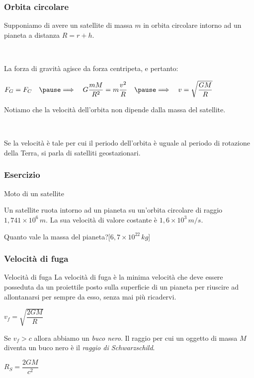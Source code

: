 \documentclass[]{beamer}
\theoremstyle{plain}
\begin{document}
\begin{frame}
\frametitle{Orbita circolare}
Supponiamo di avere un satellite di massa $ m $ in orbita circolare intorno ad un pianeta a distanza $ R = r + h $.\pause

~

La forza di gravità agisce da \alert<2>{forza centripeta}, e pertanto:
\begin{center}
$ F_G = F_C ~~~ \pause\Longrightarrow ~~~ G\dfrac{mM}{R^2} = m \dfrac{v^2}{R} ~~~ \pause\Longrightarrow ~~~ v = \sqrt{\dfrac{GM}{R}} $
\end{center}\pause
Notiamo che \alert<5>{la velocità dell'orbita non dipende dalla massa del satellite}.\pause

~

Se la velocità è tale per cui il periodo dell'orbita è uguale al periodo di rotazione della Terra, si parla di \alert<6>{satelliti geostazionari}.
\end{frame}


\begin{frame}
\frametitle{Esercizio}
\begin{exampleblock}{Moto di un satellite}
  \small{Un satellite ruota intorno ad un pianeta su un'orbita circolare di raggio $ 1,741 \times 10^{6} \, m $. La sua velocità di valore costante è $ 1,6 \times 10^{3} \, m/s $.

  Quanto vale la massa del pianeta?\hspace*{\fill}[$ 6,7 \times 10^{22} \, kg $]}
\end{exampleblock}
\end{frame}



\begin{frame}
\frametitle{Velocità di fuga}
\begin{block}{Velocità di fuga}
La velocità di fuga è la minima velocità che deve essere posseduta da un proiettile posto sulla superficie di un pianeta per riuscire ad allontanarsi per sempre da esso, senza mai più ricadervi.
\begin{center}
\colorbox{blue!30}{$ v_f = \sqrt{\dfrac{2GM}{R}} $}
\end{center}
\end{block}\pause
Se $ v_f > c $ allora abbiamo un \emph{buco nero}. Il raggio per cui un oggetto di massa $ M $ diventa un buco nero è il \emph{raggio di Schwarzschild}.
\begin{center}
$ R_S = \dfrac{2GM}{c^2} $
\end{center}
\end{frame}
\end{document}
